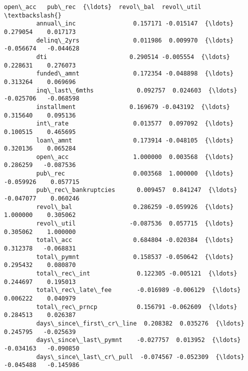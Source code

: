 \documentclass[10pt,notitlepage,onecolumn,aps,pra]{revtex4-1}
\begin{document}
\begin{Verbatim}[commandchars=\\\{\}]
                                   open\_acc   pub\_rec  {\ldots}  revol\_bal  revol\_util  \textbackslash{}
         annual\_inc                0.157171 -0.015147  {\ldots}   0.279054    0.017173   
         delinq\_2yrs               0.011986  0.009970  {\ldots}  -0.056674   -0.044628   
         dti                       0.290514 -0.005554  {\ldots}   0.228631    0.276073   
         funded\_amnt               0.172354 -0.048898  {\ldots}   0.313264    0.069696   
         inq\_last\_6mths            0.092757  0.024603  {\ldots}  -0.025706   -0.068598   
         installment               0.169679 -0.043192  {\ldots}   0.315640    0.095136   
         int\_rate                  0.013577  0.097092  {\ldots}   0.100515    0.465695   
         loan\_amnt                 0.173914 -0.048105  {\ldots}   0.320136    0.065284   
         open\_acc                  1.000000  0.003568  {\ldots}   0.286259   -0.087536   
         pub\_rec                   0.003568  1.000000  {\ldots}  -0.059926    0.057715   
         pub\_rec\_bankruptcies      0.009457  0.841247  {\ldots}  -0.047077    0.060246   
         revol\_bal                 0.286259 -0.059926  {\ldots}   1.000000    0.305062   
         revol\_util               -0.087536  0.057715  {\ldots}   0.305062    1.000000   
         total\_acc                 0.684804 -0.020384  {\ldots}   0.312378   -0.068831   
         total\_pymnt               0.158537 -0.050642  {\ldots}   0.295432    0.080870   
         total\_rec\_int             0.122305 -0.005121  {\ldots}   0.244697    0.195013   
         total\_rec\_late\_fee       -0.016989 -0.006129  {\ldots}   0.006222    0.040979   
         total\_rec\_prncp           0.156791 -0.062609  {\ldots}   0.284513    0.026387   
         days\_since\_first\_cr\_line  0.208382  0.035276  {\ldots}   0.245795   -0.025639   
         days\_since\_last\_pymnt    -0.027757  0.013952  {\ldots}  -0.034163   -0.090850   
         days\_since\_last\_cr\_pull  -0.074567 -0.052309  {\ldots}  -0.045488   -0.145986   
         

\end{Verbatim}
\end{document}

